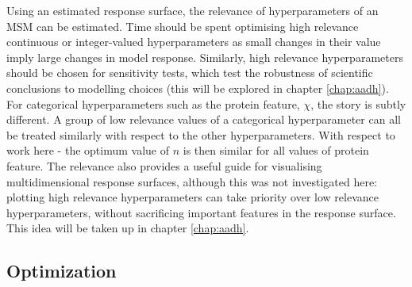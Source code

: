 Using an estimated response surface, the relevance of hyperparameters of an MSM can be estimated. Time should be spent optimising high relevance continuous or integer-valued hyperparameters as small changes in their value imply large changes in model response. Similarly, high relevance hyperparameters should be chosen for sensitivity tests, which test the robustness of scientific conclusions to modelling choices (this will be explored in chapter \ref{chap:aadh}).  For  categorical hyperparameters such as the protein feature, $\chi$, the story is subtly different.  A group of low relevance values of a categorical hyperparameter can all be treated similarly with respect to the other hyperparameters. With respect to work here - the optimum value of $n$ is then similar for all values of protein feature. The relevance also provides a useful guide for visualising multidimensional response surfaces, although this was not investigated here: plotting high relevance hyperparameters can take priority over low relevance hyperparameters, without sacrificing important features in the response surface. This idea will be taken up in chapter \ref{chap:aadh}.  

\subsection{Optimization}\label{sec:ala_opt}

